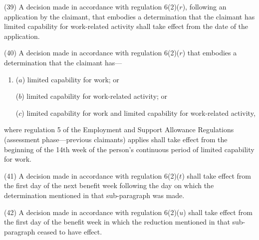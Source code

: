 \documentclass[12pt,a4paper]{article}
\begin{document}
(39) A decision made in accordance with regulation 6(2)($r$), following an application by the claimant, that embodies a determination that the claimant has limited capability for work-related activity shall take effect from the date of the application.

(40) A decision made in accordance with regulation 6(2)($r$) that embodies a determination that the claimant has—
\begin{enumerate}\item[]
($a$) limited capability for work; or

($b$) limited capability for work-related activity; or

($c$) limited capability for work and limited capability for work-related activity,
\end{enumerate}
where regulation 5 of the Employment and Support Allowance Regulations (assessment phase---previous claimants) applies shall take effect from the beginning of the 14th week of the person’s continuous period of limited capability for work.

(41) A decision made in accordance with regulation 6(2)($t$) shall take effect from the first day of the next benefit week following the day on which the determination mentioned in that sub-paragraph was made.

(42) A decision made in accordance with regulation 6(2)($u$) shall take effect from the first day of the benefit week in which the reduction mentioned in that sub-paragraph ceased to have effect.
\end{document}
